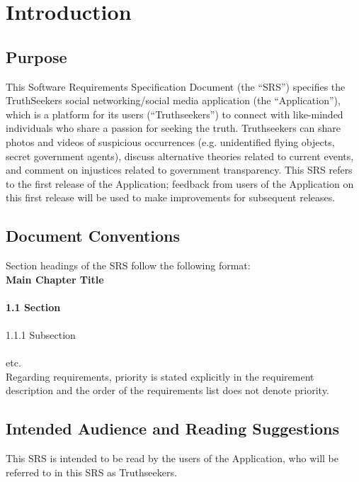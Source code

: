 \chapter{Introduction}
\label{ch:intro}


\section{Purpose }

This Software Requirements Specification Document (the “SRS”) specifies the TruthSeekers social networking/social media application (the “Application”), which is a platform for its users (“Truthseekers”) to connect with like-minded individuals who share a passion for seeking the truth. Truthseekers can share photos and videos of suspicious occurrences (e.g. unidentified flying objects, secret government agents), discuss alternative theories related to current events, and comment on injustices related to government transparency. This SRS refers to the first release of the Application; feedback from users of the Application on this first release will be used to make improvements for subsequent releases.

\section{Document Conventions}

Section headings of the SRS follow the following format:\\

{\Large\textbf{Main Chapter Title\\ \\}}
{\large\textbf{1.1	Section\\ \\}}
1.1.1 Subsection\\ \\
etc.\\

Regarding requirements, priority is stated explicitly in the requirement description and the order of the requirements list does not denote priority.

\section{Intended Audience and Reading Suggestions}

This SRS is intended to be read by the users of the Application, who will be referred to in this SRS as Truthseekers.


